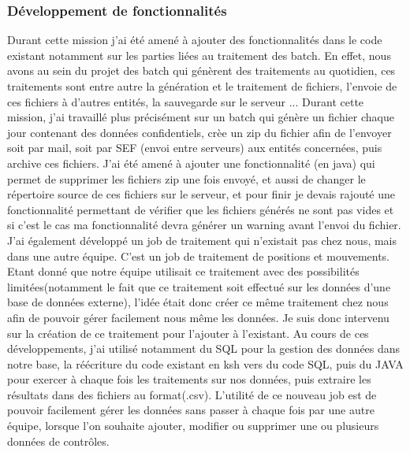 \documentclass[12pt,a4paper]{report}
\begin{document}
\subsubsection{Développement de fonctionnalités} 
Durant cette mission j'ai été amené à ajouter des fonctionnalités dans le code existant notamment sur les parties liées au traitement des batch. En effet, nous avons au sein du projet des batch qui génèrent des traitements au quotidien, ces traitements sont entre autre la génération et le traitement de fichiers, l'envoie de ces fichiers à d'autres entités, la sauvegarde sur le serveur ... Durant cette mission, j'ai travaillé plus précisément sur un batch qui génère un fichier chaque jour contenant des données confidentiels, crèe un zip du fichier afin de l'envoyer soit par mail, soit par SEF (envoi entre serveurs) aux entités concernées, puis archive ces fichiers. J'ai été amené à ajouter une fonctionnalité (en java) qui permet de supprimer les fichiers zip une fois envoyé, et aussi de changer le répertoire source de ces fichiers sur le serveur, et pour finir je devais rajouté une fonctionnalité permettant de vérifier que les fichiers générés ne sont pas vides et si c'est le cas ma fonctionnalité devra générer un warning avant l'envoi du fichier.\vspace{0.5cm}\newline
J'ai également développé un job de traitement qui n'existait pas chez nous, mais dans une autre équipe. C'est un job de traitement de positions et mouvements. Etant donné que notre équipe utilisait ce traitement avec des possibilités limitées(notamment le fait que ce traitement soit effectué sur les données d'une base de données externe), l'idée était donc créer ce même traitement chez nous afin de pouvoir gérer facilement nous même les données. Je suis donc intervenu sur la création de ce traitement pour l'ajouter à l'existant. Au cours de ces développements, j'ai utilisé notamment du SQL pour la gestion des données dans notre base, la réécriture du code existant en ksh vers du code SQL, puis du JAVA pour exercer à chaque fois les traitements sur nos données, puis extraire les résultats dans des fichiers au format(.csv). L'utilité de ce nouveau job est de pouvoir facilement gérer les données sans passer à chaque fois par une autre équipe, lorsque l'on souhaite ajouter, modifier ou supprimer une ou plusieurs données de contrôles.  
\end{document}
